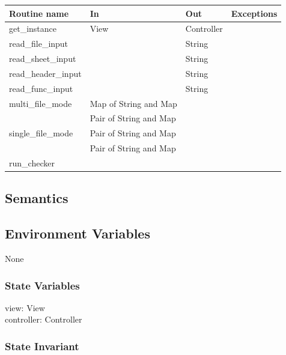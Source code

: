 \documentclass[12pt]{article}
\begin{document}
\begin{tabular}{| l | l | l | p{4.7cm} |}
\hline
\textbf{Routine name} & \textbf{In} & \textbf{Out} & \textbf{Exceptions}\\
\hline
get\_instance & View & Controller & \\
\hline
read\_file\_input & & String & \\
\hline
read\_sheet\_input & & String & \\
\hline
read\_header\_input & & String & \\
\hline
read\_func\_input & & String & \\
\hline
multi\_file\_mode & Map of String and Map & &\\
                  & Pair of String and Map &  & \\
\hline
single\_file\_mode & Pair of String and Map & &\\
                   & Pair of String and Map & & \\
\hline
run\_checker & & & \\
\hline
\end{tabular}

\subsection* {Semantics}

\subsection*{Environment Variables}

None

\subsubsection* {State Variables}

view: View \\
controller: Controller

\subsubsection* {State Invariant}
\end{document}
